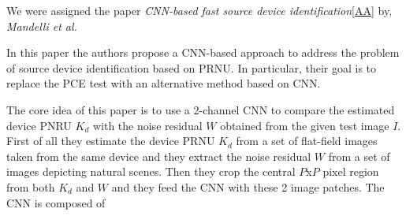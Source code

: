 We were assigned the paper \textit{CNN-based fast source device identification}\ref{AA} by, \textit{Mandelli et al.}

In this paper the authors propose a CNN-based approach to address the problem of source device identification based on PRNU. 
In particular, their goal is to replace the PCE test with an alternative method based on CNN.

The core idea of this paper is to use a 2-channel CNN to compare the estimated device PNRU $K_d$ with the noise residual $W$ 
obtained from the given test image $I$.
First of all they estimate the device PRNU $K_d$ from a set of flat-field images taken from the same device and they extract the
noise residual $W$ from a set of images depicting natural scenes.
Then they crop the central $P$x$P$ pixel region from both $K_d$ and $W$ and they feed the CNN with these 2 image patches.
The CNN is composed of 
